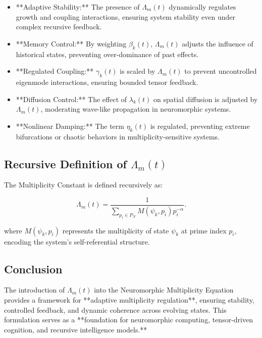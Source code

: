 \documentclass{article}
\theoremstyle{plain}
\begin{document}
\begin{itemize}
    \item **Adaptive Stability:** The presence of \( \Lambda_m(t) \) dynamically regulates growth and coupling interactions, ensuring system stability even under complex recursive feedback.
    \item **Memory Control:** By weighting \( \beta_k(t) \), \( \Lambda_m(t) \) adjusts the influence of historical states, preventing over-dominance of past effects.
    \item **Regulated Coupling:** \( \gamma_k(t) \) is scaled by \( \Lambda_m(t) \) to prevent uncontrolled eigenmode interactions, ensuring bounded tensor feedback.
    \item **Diffusion Control:** The effect of \( \lambda_k(t) \) on spatial diffusion is adjusted by \( \Lambda_m(t) \), moderating wave-like propagation in neuromorphic systems.
    \item **Nonlinear Damping:** The term \( \eta_k(t) \) is regulated, preventing extreme bifurcations or chaotic behaviors in multiplicity-sensitive systems.
\end{itemize}

\subsection{Recursive Definition of \( \Lambda_m(t) \)}

The Multiplicity Constant is defined recursively as:

\begin{equation}
\Lambda_m(t) = \frac{1}{\sum_{p_i \in P_N} M(\psi_k, p_i) p_i^{-\alpha}}.
\end{equation}

where \( M(\psi_k, p_i) \) represents the multiplicity of state \( \psi_k \) at prime index \( p_i \), encoding the system’s self-referential structure.

\subsection{Conclusion}

The introduction of \( \Lambda_m(t) \) into the Neuromorphic Multiplicity Equation provides a framework for **adaptive multiplicity regulation**, ensuring stability, controlled feedback, and dynamic coherence across evolving states. This formulation serves as a **foundation for neuromorphic computing, tensor-driven cognition, and recursive intelligence models.**
\end{document}
